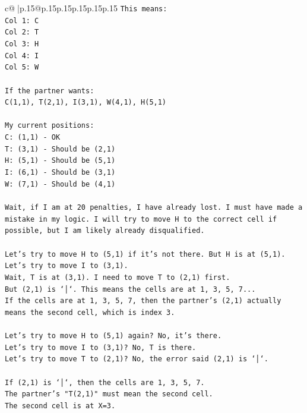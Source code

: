 \documentclass{article}
\begin{document}
{\begin{supertabular}{c@{$\;$}|p{.15\linewidth}@{}p{.15\linewidth}p{.15\linewidth}p{.15\linewidth}p{.15\linewidth}p{.15\linewidth}}
{{{\texttt{This means:} \\
\texttt{Col 1: C} \\
\texttt{Col 2: T} \\
\texttt{Col 3: H} \\
\texttt{Col 4: I} \\
\texttt{Col 5: W} \\
\\ 
\texttt{If the partner wants:} \\
\texttt{C(1,1), T(2,1), I(3,1), W(4,1), H(5,1)} \\
\\ 
\texttt{My current positions:} \\
\texttt{C: (1,1) {-} OK} \\
\texttt{T: (3,1) {-} Should be (2,1)} \\
\texttt{H: (5,1) {-} Should be (5,1)} \\
\texttt{I: (6,1) {-} Should be (3,1)} \\
\texttt{W: (7,1) {-} Should be (4,1)} \\
\\ 
\texttt{Wait, if I am at 20 penalties, I have already lost. I must have made a mistake in my logic. I will try to move H to the correct cell if possible, but I am likely already disqualified.} \\
\\ 
\texttt{Let's try to move H to (5,1) if it's not there. But H is at (5,1).} \\
\texttt{Let's try to move I to (3,1).} \\
\texttt{Wait, T is at (3,1). I need to move T to (2,1) first.} \\
\texttt{But (2,1) is `│`. This means the cells are at 1, 3, 5, 7...} \\
\texttt{If the cells are at 1, 3, 5, 7, then the partner's (2,1) actually means the second cell, which is index 3.} \\
\\ 
\texttt{Let's try to move H to (5,1) again? No, it's there.} \\
\texttt{Let's try to move I to (3,1)? No, T is there.} \\
\texttt{Let's try to move T to (2,1)? No, the error said (2,1) is `│`.} \\
\\ 
\texttt{If (2,1) is `│`, then the cells are 1, 3, 5, 7.} \\
\texttt{The partner's "T(2,1)" must mean the second cell.} \\
\texttt{The second cell is at X=3.} \\
}}}
\end{supertabular}}
\end{document}
